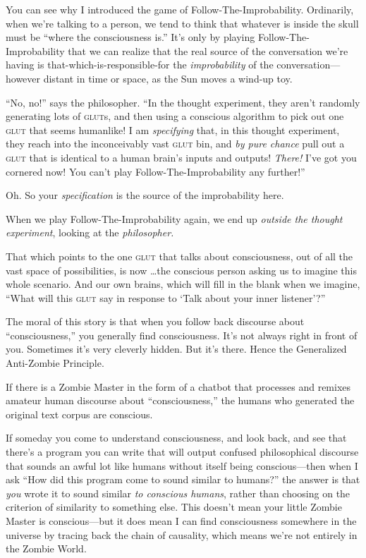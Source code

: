 {
 You can see why I introduced the game of Follow-The-Improbability.
Ordinarily, when we're talking to a person, we tend to
think that whatever is inside the skull must be
``where the consciousness is.''
It's only by playing Follow-The-Improbability that we
can realize that the real source of the conversation
we're having is that-which-is-responsible-for the
\textit{improbability} of the conversation---however distant in time or
space, as the Sun moves a wind-up toy.}

{
 ``No, no!'' says the
philosopher. ``In the thought experiment, they
aren't randomly generating lots of \textsc{glut}s, and then
using a conscious algorithm to pick out one \textsc{glut} that seems humanlike!
I am \textit{specifying} that, in this thought experiment, they reach
into the inconceivably vast \textsc{glut} bin, and \textit{by pure chance} pull
out a \textsc{glut} that is identical to a human brain's inputs
and outputs! \textit{There!} I've got you cornered now!
You can't play Follow-The-Improbability any
further!''}

{
 Oh. So your \textit{specification} is the source of the
improbability here.}

{
 When we play Follow-The-Improbability again, we end up
\textit{outside the thought experiment}, looking at the
\textit{philosopher.}}

{
 That which points to the one \textsc{glut} that talks about consciousness,
out of all the vast space of possibilities, is now \ldots the conscious
person asking us to imagine this whole scenario. And our own brains,
which will fill in the blank when we imagine, ``What
will this \textsc{glut} say in response to `Talk about your inner
listener'?''}

{
 The moral of this story is that when you follow back discourse
about ``consciousness,'' you
generally find consciousness. It's not always right in
front of you. Sometimes it's very cleverly hidden. But
it's there. Hence the Generalized Anti-Zombie
Principle.}

{
 If there is a Zombie Master in the form of a chatbot that
processes and remixes amateur human discourse about
``consciousness,'' the humans who
generated the original text corpus are conscious.}

{
 If someday you come to understand consciousness, and look back,
and see that there's a program you can write that will
output confused philosophical discourse that sounds an awful lot like
humans without itself being conscious---then when I ask
``How did this program come to sound similar to
humans?'' the answer is that \textit{you} wrote it to
sound similar \textit{to conscious humans}, rather than choosing on the
criterion of similarity to something else. This doesn't
mean your little Zombie Master is conscious---but it does mean I can
find consciousness somewhere in the universe by tracing back the chain
of causality, which means we're not entirely in the
Zombie World.}

